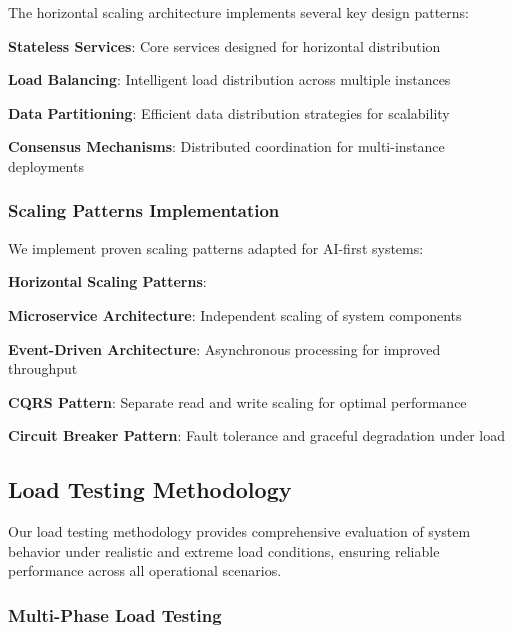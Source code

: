 The horizontal scaling architecture implements several key design patterns:

\begin{expandedlist}
    \item \textbf{Stateless Services}: Core services designed for horizontal distribution
    \item \textbf{Load Balancing}: Intelligent load distribution across multiple instances
    \item \textbf{Data Partitioning}: Efficient data distribution strategies for scalability
    \item \textbf{Consensus Mechanisms}: Distributed coordination for multi-instance deployments
\end{expandedlist}

\subsubsection*{Scaling Patterns Implementation}

We implement proven scaling patterns adapted for AI-first systems:

\begin{successbox}
\textbf{Horizontal Scaling Patterns}:
\begin{compactlist}
    \item \textbf{Microservice Architecture}: Independent scaling of system components
    \item \textbf{Event-Driven Architecture}: Asynchronous processing for improved throughput
    \item \textbf{CQRS Pattern}: Separate read and write scaling for optimal performance
    \item \textbf{Circuit Breaker Pattern}: Fault tolerance and graceful degradation under load
\end{compactlist}
\end{successbox}

\subsection*{Load Testing Methodology}

Our load testing methodology provides comprehensive evaluation of system behavior under realistic and extreme load conditions, ensuring reliable performance across all operational scenarios.

\subsubsection*{Multi-Phase Load Testing}

